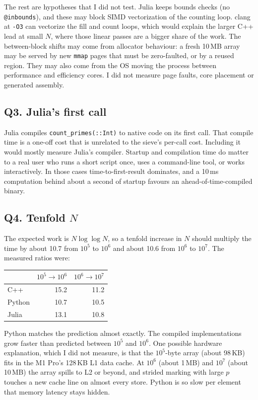 \documentclass[11pt,a4paper]{article}
\newcommand{\code}[1]{\texttt{#1}}
\newcommand{\tenp}[1]{10^{#1}}
\begin{document}
The rest are hypotheses that I did not test. Julia keeps bounds checks (no \code{@inbounds}), and
these may block SIMD vectorization of the counting loop. clang at \code{-O3} can vectorize the fill
and count loops, which would explain the larger C++ lead at small $N$, where those linear passes are a
bigger share of the work. The between-block shifts may come from allocator behaviour: a fresh 10\,MB
array may be served by new \code{mmap} pages that must be zero-faulted, or by a reused region. They
may also come from the OS moving the process between performance and efficiency cores. I did not
measure page faults, core placement or generated assembly.

\subsection*{Q3. Julia's first call}
Julia compiles \code{count\_primes(::Int)} to native code on its first call. That compile time is a
one-off cost that is unrelated to the sieve's per-call cost. Including it would mostly measure
Julia's compiler. Startup and compilation time do matter to a real user who runs a short script once,
uses a command-line tool, or works interactively. In those cases time-to-first-result dominates, and
a 10\,ms computation behind about a second of startup favours an ahead-of-time-compiled binary.

\subsection*{Q4. Tenfold $N$}
The expected work is $N \log\log N$, so a tenfold increase in $N$ should multiply the time by about
10.7 from $\tenp{5}$ to $\tenp{6}$ and about 10.6 from $\tenp{6}$ to $\tenp{7}$. The measured ratios
were:

\begin{table}[H]
\centering
\begin{tabular}{lrr}
\toprule
 & $\tenp{5} \to \tenp{6}$ & $\tenp{6} \to \tenp{7}$ \\
\midrule
C++    & 15.2 & 11.2 \\
Python & 10.7 & 10.5 \\
Julia  & 13.1 & 10.8 \\
\bottomrule
\end{tabular}
\end{table}

Python matches the prediction almost exactly. The compiled implementations grow faster than
predicted between $\tenp{5}$ and $\tenp{6}$. One possible hardware explanation, which I did not
measure, is that the $\tenp{5}$-byte array (about 98\,KB) fits in the M1 Pro's 128\,KB L1 data cache.
At $\tenp{6}$ (about 1\,MB) and $\tenp{7}$ (about 10\,MB) the array spills to L2 or beyond, and
strided marking with large $p$ touches a new cache line on almost every store. Python is so slow per
element that memory latency stays hidden.
\end{document}
